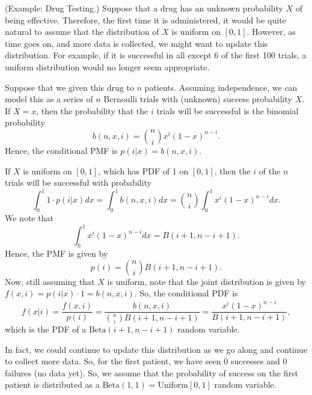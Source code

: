 \documentclass[letterpaper]{article}
\begin{document}
\begin{mdframed}[]
    (Example: Drug Testing.) Suppose that a drug has an unknown probability $X$ of being effective. Therefore, the first time it is administered, it would be quite natural to assume that the distribution of $X$ is uniform on $[0, 1]$. However, as time goes on, and more data is collected, we might want to update this distribution. For example, if it is successful in all except 6 of the first 100 trials, a uniform distribution would no longer seem appropriate. 

    \bigskip 

    Suppose that we given this drug to $n$ patients. Assuming independence, we can model this as a series of $n$ Bernoulli trials with (unknown) success probability $X$. If $X = x$, then the probability that the $i$ trials will be successful is the binomial probability 
    \[b(n, x, i) = \binom{n}{i} x^i (1 - x)^{n - i}.\]
    Hence, the conditional PMF is $p(i | x) = b(n, x, i)$. 

    \bigskip 

    If $X$ is uniform on $[0, 1]$, which has PDF of 1 on $[0, 1]$, then the $i$ of the $n$ trials will be successful with probability
    \[\int_0^1 1 \cdot p(i | x) dx = \int_0^1 b(n, x, i)dx = \binom{n}{i} \int_0^1 x^i (1 - x)^{n - i} dx.\]
    We note that 
    \[\int_0^1 x^i (1 - x)^{n - i} dx = B(i + 1, n - i + 1).\]
    Hence, the PMF is given by 
    \[p(i) = \binom{n}{i} B(i + 1, n - i + 1).\]
    Now, still assuming that $X$ is uniform, note that the joint distribution is given by $f(x, i) = p(i | x) \cdot 1 = b(n, x, i)$. So, the conditional PDF is 
    \[f(x | i) = \frac{f(x, i)}{p(i)} = \frac{b(n, x, i)}{\binom{n}{i} B(i + 1, n - i + 1)} = \frac{x^i (1 - x)^{n - i}}{B(i + 1, n - i + 1)},\]
    which is the PDF of a $\text{Beta}(i + 1, n - i + 1)$ random variable.

    \bigskip 

    In fact, we could continue to update this distribution as we go along and continue to collect more data. So, for the first patient, we have seen 0 successes and 0 failures (no data yet). So, we assume that the probability of success on the first patient is distributed as a $\text{Beta}(1, 1) = \text{Uniform}[0, 1]$ random variable. 
\end{mdframed}
\end{document}
